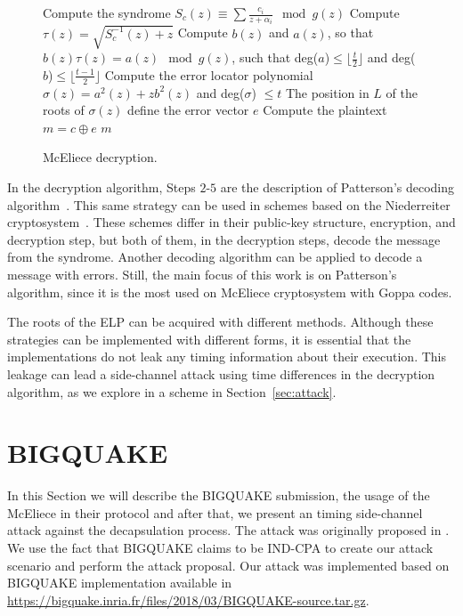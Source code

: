 \begin{figure}[ht]
\centering
    \begin{algorithm}[H]
     Compute the syndrome $S_c(z) \equiv \sum{\frac{c_i}{z+\alpha_i}} \mod g(z)$\;
     Compute $\tau(z) = \sqrt{S^{-1}_{c}(z)+z}$\;
     Compute $b(z)$ and $a(z)$, so that $b(z)\tau(z) = a(z) \mod g(z)$, such that deg($a$)$\leq \lfloor \frac{t}{2} \rfloor$ and deg($b$)$\leq \lfloor \frac{t-1}{2} \rfloor$\;
     Compute the error locator polynomial $\sigma(z) = a^2(z) + zb^2(z)$ and deg($\sigma$) $\leq t$\;
     The position in $L$ of the roots of $\sigma(z)$ define the error vector $e$\;
     Compute the plaintext $m = c \oplus e$\;
     \Return $m$\;
     \caption{McEliece decryption.}\label{alg:3}
    \end{algorithm}
\end{figure}


In the decryption algorithm, Steps $2$-$5$ are the description of Patterson's decoding algorithm~\cite{patterson1975algebraic}. This same strategy can be used in schemes based on the Niederreiter cryptosystem~\cite{niederreiter}. These schemes differ in their public-key structure, encryption, and decryption step, but both of them, in the decryption steps, decode the message from the syndrome. Another decoding algorithm can be applied to decode a message with errors. Still, the main focus of this work is on Patterson's algorithm, since it is the most used on McEliece cryptosystem with Goppa codes. 

The roots of the ELP can be acquired with different methods. Although these strategies can be implemented with different forms, it is essential that the implementations do not leak any timing information about their execution. This leakage can lead a side-channel attack using time differences in the decryption algorithm, as we explore in a scheme in Section~\ref{sec:attack}.

\section{BIGQUAKE}
In this Section we will describe the BIGQUAKE submission, the usage of the McEliece in their protocol and after that, we present an timing side-channel attack against the decapsulation process. The attack was originally proposed in \cite{shoufan2009timing}. We use the fact that BIGQUAKE claims to be IND-CPA to create our attack scenario and perform the attack proposal. Our attack was implemented based on BIGQUAKE implementation available in \url{https://bigquake.inria.fr/files/2018/03/BIGQUAKE-source.tar.gz}.

